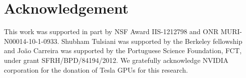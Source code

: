 \section*{Acknowledgement}
This work was supported in part by NSF Award IIS-1212798 and ONR MURI-N00014-10-1-0933. Shubham Tulsiani was supported by the Berkeley fellowship and Jo\~{a}o Carreira was supported by the Portuguese Science Foundation, FCT, under grant SFRH/BPD/84194/2012. We gratefully acknowledge NVIDIA corporation for the donation of Tesla GPUs for this research.
